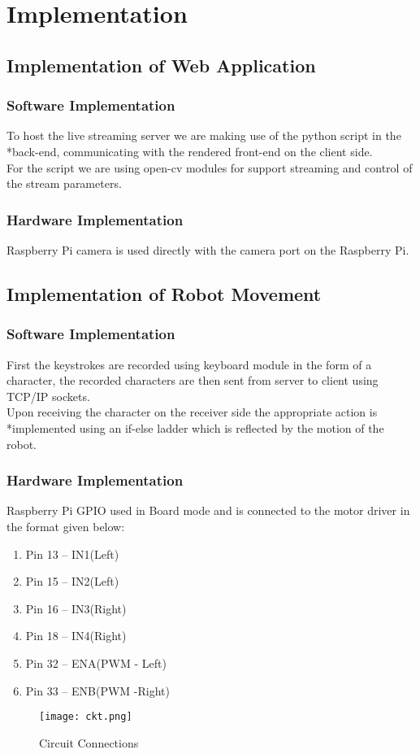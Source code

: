 \chapter{Implementation}
\section{Implementation of Web Application}
\subsection{Software Implementation}
To host the live streaming server we are making use of the python script in the \\*back-end, communicating with the rendered front-end on the client side.\\
\newline
For the script we are using open-cv modules for support streaming and control of the stream parameters. 

\subsection{Hardware Implementation}
Raspberry Pi camera is used directly with the camera port on the Raspberry Pi.
\section{Implementation of Robot Movement}
\subsection{Software Implementation}

First the keystrokes are recorded using keyboard module in the form of a character, the recorded characters are then sent from server to client using TCP/IP sockets.\\
\newline
Upon receiving the character on the receiver side the appropriate action is \\*implemented using an if-else ladder which is reflected by the motion of the robot.
\newpage
\subsection{Hardware Implementation}
Raspberry Pi GPIO used in Board mode and is connected to the motor driver in the format given below:
\begin{enumerate}[ ]
\item Pin 13 – IN1(Left)
\item Pin 15 – IN2(Left)
\item Pin 16 – IN3(Right)
\item Pin 18 – IN4(Right)
\item Pin 32 – ENA(PWM - Left)
\item Pin 33 – ENB(PWM -Right)
\end{enumerate}
\begin{figure}[h]
\centering
\texttt{[image: ckt.png]}
\caption{Circuit Connections}
\end{figure}